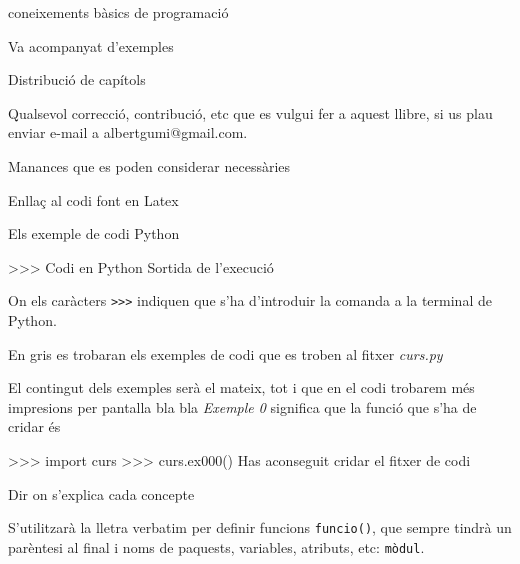 coneixements bàsics de programació

Va acompanyat d'exemples

Distribució de capítols

Qualsevol correcció, contribució, etc que es vulgui fer a aquest llibre, si us plau enviar e-mail a albertgumi@gmail.com.

Manances que es poden considerar necessàries

Enllaç al codi font en Latex


Els exemple de codi Python

\begin{blockcode}
>>> Codi en Python
Sortida de l'execució
\end{blockcode}

On els caràcters {\tt >>>} indiquen que s'ha d'introduir la comanda a la terminal de Python.


En gris es trobaran els exemples de codi que es troben al fitxer \emph{curs.py}

El contingut dels exemples serà el mateix, tot i que en el codi trobarem més impresions per pantalla bla bla \emph{Exemple 0} significa que la funció que s'ha de cridar és

\begin{blockcode}
>>> import curs
>>> curs.ex000()
Has aconseguit cridar el fitxer de codi
\end{blockcode}

Dir on s'explica cada concepte


S'utilitzarà la lletra verbatim per definir funcions {\tt funcio()}, que sempre tindrà un parèntesi al final i noms de paquests, variables, atributs, etc: {\tt mòdul}.


